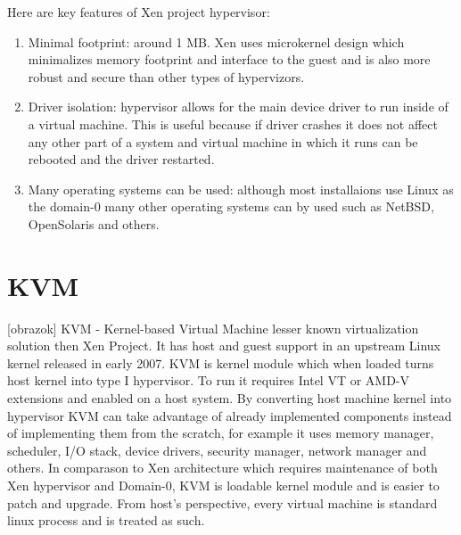 \begin{itemize}
Here are key features of Xen project hypervisor:
\begin{enumerate}
\item Minimal footprint: around 1 MB. Xen uses microkernel design which minimalizes memory footprint and interface to the guest and is also more robust and secure than other types of hypervizors.
\item Driver isolation: hypervisor allows for the main device driver to run inside of a virtual machine. This is useful because if driver crashes it does not affect any other part of a system and virtual machine in which it runs can be rebooted and the driver restarted.
\item Many operating systems can be used: although most installaions use Linux as the domain-0 many other operating systems can by used such as NetBSD, OpenSolaris and others.
\end{enumerate}


\section{KVM}
[obrazok] KVM - Kernel-based Virtual Machine lesser known virtualization solution then Xen Project. It has host and guest support in an upstream Linux kernel released in early 2007. KVM is kernel module which when loaded turns host kernel into type I hypervisor. To run it requires Intel VT or AMD-V extensions and enabled on a host system. By converting host machine kernel into hypervisor KVM can take advantage of already implemented components instead of implementing them from the scratch, for example it uses memory manager, scheduler, I/O stack, device drivers, security manager, network manager and others. In comparason to Xen architecture which requires maintenance of both Xen hypervisor and Domain-0, KVM is loadable kernel module and is easier to patch and upgrade. From host's perspective, every virtual machine is standard linux process and is treated as such.


\end{itemize}
